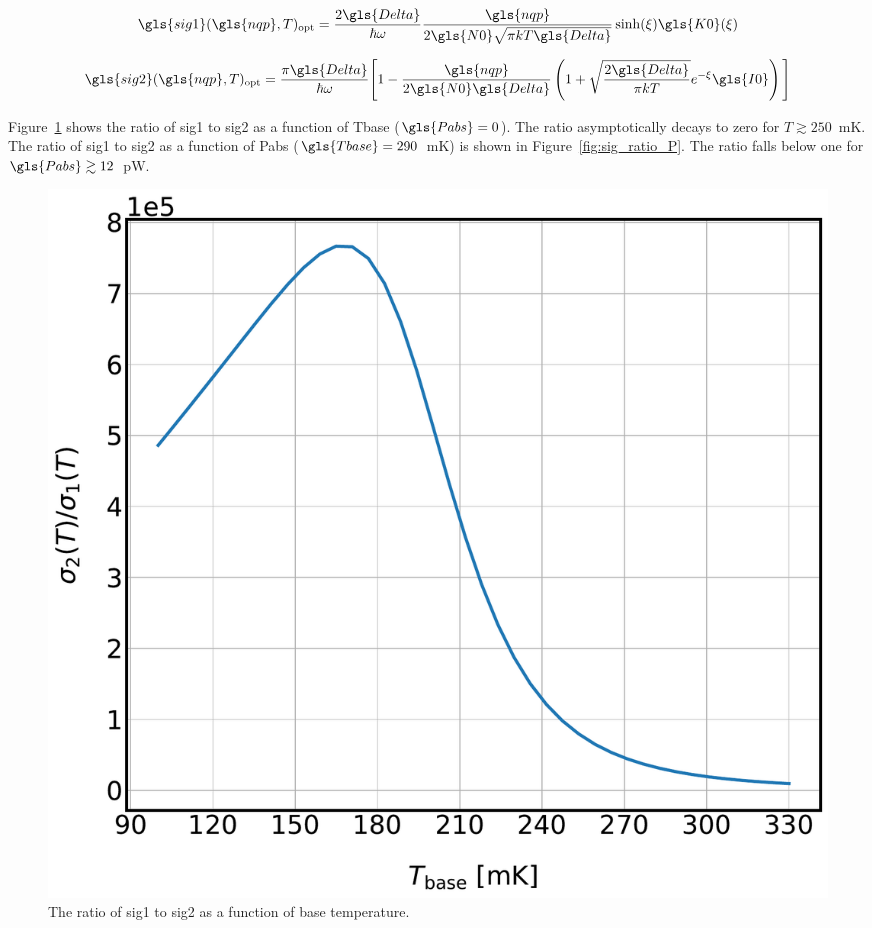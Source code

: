 \begin{equation}
  \gls{sig1}(\gls{nqp}, T)_{\mathrm{opt}} = \frac{2\gls{Delta}}{\hbar \omega} \frac{ \gls{nqp}} { 2\gls{N0}\sqrt{\pi kT\gls{Delta}}}\sinh(\xi)\gls{K0}(\xi)
\end{equation}

\begin{equation}
  \gls{sig2}(\gls{nqp}, T)_{\mathrm{opt}} = \frac{ \pi\gls{Delta} }{ \hbar\omega } \Bigg[ 1 - \frac{ \gls{nqp} }{ 2\gls{N0}\gls{Delta} } \left( 1 +
  \sqrt{ \frac{ 2 \gls{Delta} }{ \pi kT } } e^{-\xi} \gls{I0} \right) \Bigg]
\end{equation}

Figure~\ref{fig:sig_ratio_T} shows the ratio of \gls{sig1} to \gls{sig2} as a function of \gls{Tbase} ($\gls{Pabs} = 0$). The ratio asymptotically decays to zero for $T \gtrsim 250$~mK. The ratio of \gls{sig1} to \gls{sig2} as a function of \gls{Pabs} ($\gls{Tbase} = 290$~mK) is shown in Figure~\ref{fig:sig_ratio_P}. The ratio falls below one for $\gls{Pabs} \gtrsim 12$~pW.

\begin{figure}[!htbp]
\centering
\includegraphics[width=\textwidth]{figures/kid_model/sig_ratio_T}
\caption[The ratio of  to  as a function of base temperature.]{The ratio of \gls{sig1} to \gls{sig2} as a function of base temperature.}
\label{fig:sig_ratio_T}
\end{figure}

